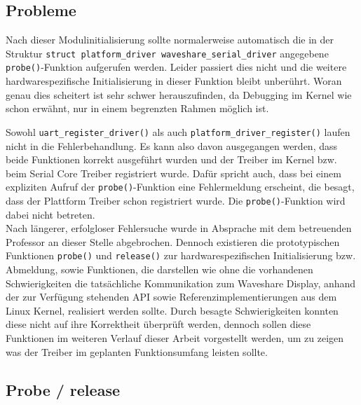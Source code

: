 \subsection{Probleme}
Nach dieser Modulinitialisierung sollte normalerweise automatisch die in der Struktur \texttt{struct platform_driver waveshare_serial_driver} angegebene \texttt{probe()}-Funktion aufgerufen werden. Leider passiert dies nicht und die weitere hardwarespezifische Initialisierung in dieser Funktion bleibt unberührt. Woran genau dies scheitert ist sehr schwer herauszufinden, da Debugging im Kernel wie schon erwähnt, nur in einem begrenzten Rahmen möglich ist.

Sowohl \texttt{uart_register_driver()} als auch \texttt{platform_driver_register()} laufen nicht in die Fehlerbehandlung. Es kann also davon ausgegangen werden, dass beide Funktionen korrekt ausgeführt wurden und der Treiber im Kernel bzw. beim Serial Core Treiber registriert wurde. Dafür spricht auch, dass bei einem expliziten Aufruf der \texttt{probe()}-Funktion eine Fehlermeldung erscheint, die besagt, dass der Plattform Treiber schon registriert wurde. Die \texttt{probe()}-Funktion wird dabei nicht betreten. \\ %

Nach längerer, erfolgloser Fehlersuche wurde in Absprache mit dem betreuenden Professor an dieser Stelle abgebrochen. Dennoch existieren die prototypischen Funktionen \texttt{probe()} und \texttt{release()} zur hardwarespezifischen Initialisierung bzw. Abmeldung, sowie Funktionen, die darstellen wie ohne die vorhandenen Schwierigkeiten die tatsächliche Kommunikation zum Waveshare Display, anhand der zur Verfügung stehenden API sowie Referenzimplementierungen aus dem Linux Kernel, realisiert werden sollte. Durch besagte Schwierigkeiten konnten diese nicht auf ihre Korrektheit überprüft werden, dennoch sollen diese Funktionen im weiteren Verlauf dieser Arbeit vorgestellt werden, um zu zeigen was der Treiber im geplanten Funktionsumfang leisten sollte.

\subsection{Probe / release} %



